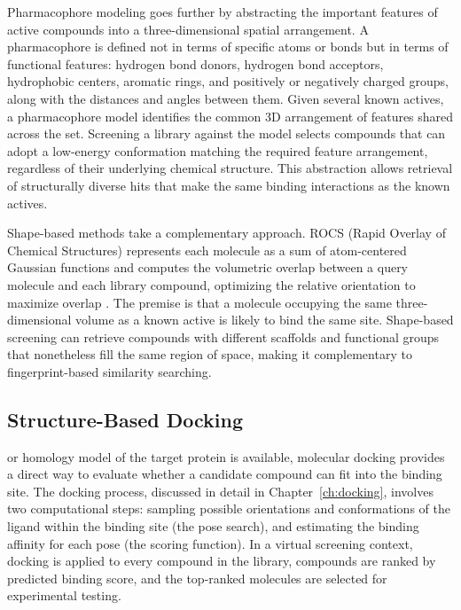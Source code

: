 Pharmacophore modeling goes further by abstracting the important features of active compounds into a three-dimensional spatial arrangement. A pharmacophore is defined not in terms of specific atoms or bonds but in terms of functional features: hydrogen bond donors, hydrogen bond acceptors, hydrophobic centers, aromatic rings, and positively or negatively charged groups, along with the distances and angles between them. Given several known actives, a pharmacophore model identifies the common 3D arrangement of features shared across the set. Screening a library against the model selects compounds that can adopt a low-energy conformation matching the required feature arrangement, regardless of their underlying chemical structure. This abstraction allows retrieval of structurally diverse hits that make the same binding interactions as the known actives.

Shape-based methods take a complementary approach. ROCS (Rapid Overlay of Chemical Structures) represents each molecule as a sum of atom-centered Gaussian functions and computes the volumetric overlap between a query molecule and each library compound, optimizing the relative orientation to maximize overlap \cite{mcgann2011}. The premise is that a molecule occupying the same three-dimensional volume as a known active is likely to bind the same site. Shape-based screening can retrieve compounds with different scaffolds and functional groups that nonetheless fill the same region of space, making it complementary to fingerprint-based similarity searching.


\subsection{Structure-Based Docking}
\label{sec:docking-screening}

 or homology model of the target protein is available, molecular docking provides a direct way to evaluate whether a candidate compound can fit into the binding site. The docking process, discussed in detail in Chapter~\ref{ch:docking}, involves two computational steps: sampling possible orientations and conformations of the ligand within the binding site (the pose search), and estimating the binding affinity for each pose (the scoring function). In a virtual screening context, docking is applied to every compound in the library, compounds are ranked by predicted binding score, and the top-ranked molecules are selected for experimental testing.

